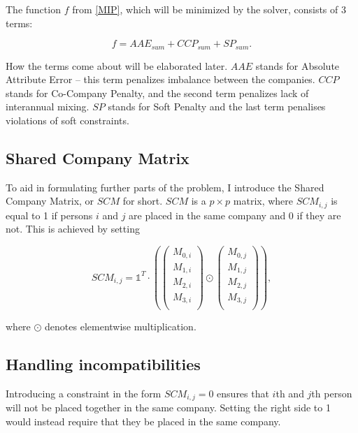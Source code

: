\documentclass[11pt]{article}
\begin{document}
The function $f$ from \ref{MIP}, which will be minimized by the solver, consists of 3 terms:

\begin{equation}
    f = AAE_{sum} + CCP_{sum} + SP_{sum}.
\end{equation}

How the terms come about will be elaborated later.  $AAE$ stands for Absolute Attribute Error -- this term penalizes imbalance between the companies.  $CCP$
stands for Co-Company Penalty, and the second term penalizes lack of interannual mixing.  $SP$ stands for Soft Penalty and the last term penalises violations
of soft constraints.

\subsection{Shared Company Matrix}
\label{SCM}
To aid in formulating further parts of the problem, I introduce the Shared Company Matrix, or $SCM$ for short.  $SCM$ is a $p\times{}p$ matrix, where 
$SCM_{i,j}$ is equal to 1 if persons $i$ and $j$ are placed in the same company and 0 if they are not.  This is achieved by setting

\begin{equation}
    SCM_{i,j} = \mathbb{1}^{T} \cdot 
    (
        \begin{pmatrix}
        M_{0,i} \\
        M_{1,i} \\
        M_{2,i} \\
        M_{3,i} \\
    \end{pmatrix}
\odot
    \begin{pmatrix}
    M_{0,j} \\
    M_{1,j} \\
    M_{2,j} \\
    M_{3,j} \\
    \end{pmatrix}
    ),
\end{equation}

where $\odot$ denotes elementwise multiplication.

\subsection{Handling incompatibilities}

Introducing a constraint in the form $SCM_{i,j} = 0$ ensures that $i$th and $j$th person will not be placed together in the same company.  Setting the right
side to 1 would instead require that they be placed in the same company.
\end{document}
